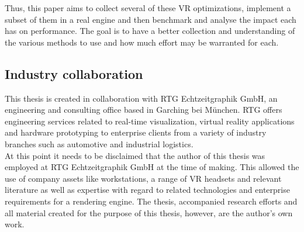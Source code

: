 Thus, this paper aims to collect several of these VR optimizations, implement a subset of them in a real engine and then benchmark and analyse the impact each has on performance. The goal is to have a better collection and understanding of the various methods to use and how much effort may be warranted for each. 

\subsection{Industry collaboration}
This thesis is created in collaboration with RTG Echtzeitgraphik GmbH, an engineering and consulting office based in Garching bei München. RTG offers engineering services related to real-time visualization, virtual reality applications and hardware prototyping to enterprise clients from a variety of industry branches such as automotive and industrial logistics. \\
At this point it needs to be disclaimed that the author of this thesis was employed at RTG Echtzeitgraphik GmbH at the time of making. This allowed the use of company assets like workstations, a range of VR headsets and relevant literature as well as expertise with regard to related technologies and enterprise requirements for a rendering engine. The thesis, accompanied research efforts and all material created for the purpose of this thesis, however, are the author's own work. 

